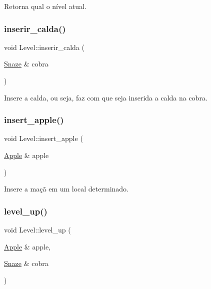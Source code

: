 Retorna qual o nível atual. 

\mbox{\label{classLevel_a00b118e009a3c8e8b4f33de9493e3a6a}} 
\subsubsection{\texorpdfstring{inserir\+\_\+calda()}{inserir\_calda()}}
{\footnotesize\ttfamily void Level\+::inserir\+\_\+calda (\begin{DoxyParamCaption}\item[{\hyperlink{classSnaze}{Snaze} \&}]{cobra }\end{DoxyParamCaption})\hspace{0.3cm}{\ttfamily [inline]}}



Insere a calda, ou seja, faz com que seja inserida a calda na cobra. 

\mbox{\label{classLevel_a4ee0703973ca3ea41f056ffd775fc95f}} 
\subsubsection{\texorpdfstring{insert\+\_\+apple()}{insert\_apple()}}
{\footnotesize\ttfamily void Level\+::insert\+\_\+apple (\begin{DoxyParamCaption}\item[{\hyperlink{classApple}{Apple} \&}]{apple }\end{DoxyParamCaption})\hspace{0.3cm}{\ttfamily [inline]}}



Insere a maçã em um local determinado. 

\mbox{\label{classLevel_a843e6dc68560b09ea31b8650e916c088}} 
\subsubsection{\texorpdfstring{level\+\_\+up()}{level\_up()}}
{\footnotesize\ttfamily void Level\+::level\+\_\+up (\begin{DoxyParamCaption}\item[{\hyperlink{classApple}{Apple} \&}]{apple,  }\item[{\hyperlink{classSnaze}{Snaze} \&}]{cobra }\end{DoxyParamCaption})\hspace{0.3cm}{\ttfamily [inline]}}



